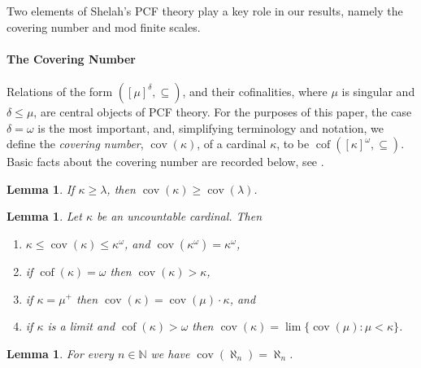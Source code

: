 \documentclass{article}
\newtheorem{lem}[thm]{Lemma}
\DeclareMathOperator{\cof}{cof}
\begin{document}
Two elements of  Shelah's \textsc{PCF} theory 
play a key role in our results, namely the covering number and mod finite scales.

\paragraph{The Covering Number} 
Relations of the form $([\mu]^{\delta},\subseteq)$, and their cofinalities, where $\mu$ is singular and  $\delta\leq\mu$, are central objects of \textsc{PCF} theory. For the purposes of this paper, the case $\delta=\omega$ is the most important, and, simplifying terminology and notation, we define the \emph{covering number}, $\mathop{cov}(\kappa)$, of a cardinal $\kappa$, to be $\cof([\kappa]^\omega,\subseteq)$. Basic facts about the covering number are recorded below, see \cite{ShelahBook}.

\begin{lem}\label{lem:samIncreasing}
    If $\kappa\geq\lambda$, then $\mathop{cov}(\kappa)\geq\mathop{cov}(\lambda)$.
\end{lem}



\begin{lem} \label{l:sam1} 
Let $\kappa$ be an uncountable cardinal. Then
\begin{enumerate}[noitemsep,topsep=1pt]
\item[(i)]  $\kappa \le \mathop{cov}(\kappa) \le \kappa^\omega$, and $\mathop{cov}(\kappa^\omega)=\kappa^\omega$, 

\item[(ii)] if $\cof(\kappa)=\omega$ then $\mathop{cov}(\kappa) > \kappa$,

\item[(iii)] if $\kappa=\mu^+$ then     $\mathop{cov}(\kappa) = \mathop{cov}(\mu)\cdot\kappa$,  and

\item[(iv)] if $\kappa$ is a limit and $\cof(\kappa)>\omega$  then $\mathop{cov}(\kappa)=\lim \{\mathop{cov}(\mu) : \mu<\kappa\}$. 
\end{enumerate}
\end{lem}

\begin{lem}\label{l:sam_aleph_n}
    For every $n \in \mathbb{N}$ we have $\mathop{cov}(\aleph_n)=\aleph_n$.
\end{lem} 
\end{document}

